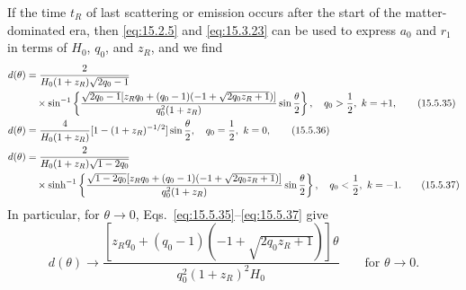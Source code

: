 If the time \(t_R\) of last scattering or emission occurs after the start of
the matter-dominated era, then \eqref{eq:15.2.5} and \eqref{eq:15.3.23} can
be used to express \(a_0\) and \(r_1\) in terms of \(H_0\), \(q_0\), and
\(z_R\), and we find
\begin{align}
  d(\theta)
  &=
  \frac{2}{H_0(1+z_R)\sqrt{2q_0-1}}
  \notag\\
  &\quad\times
  \sin^{-1}\left\{
    \frac{
      \sqrt{2q_0-1}
      [z_Rq_0+(q_0-1)(-1+\sqrt{2q_0z_R+1})]
    }{q_0^2(1+z_R)}
    \sin\frac{\theta}{2}
  \right\},
  \quad q_0>\frac12,\ k=+1,
  \tag{15.5.35}\label{eq:15.5.35}\\
  d(\theta)
  &=
  \frac{4}{H_0(1+z_R)}
  [1-(1+z_R)^{-1/2}]
  \sin\frac{\theta}{2},
  \quad q_0=\frac12,\ k=0,
  \tag{15.5.36}\label{eq:15.5.36}\\
  d(\theta)
  &=
  \frac{2}{H_0(1+z_R)\sqrt{1-2q_0}}
  \notag\\
  &\quad\times
  \sinh^{-1}\left\{
    \frac{
      \sqrt{1-2q_0}
      [z_Rq_0+(q_0-1)(-1+\sqrt{2q_0z_R+1})]
    }{q_0^2(1+z_R)}
    \sin\frac{\theta}{2}
  \right\},
  \quad q_0<\frac12,\ k=-1.
  \tag{15.5.37}\label{eq:15.5.37}
\end{align}
In particular, for \(\theta\to0\),
Eqs.~\eqref{eq:15.5.35}--\eqref{eq:15.5.37} give
\[
  d(\theta)
  \longrightarrow
  \frac{
    [z_Rq_0+(q_0-1)(-1+\sqrt{2q_0z_R+1})]\theta
  }{
    q_0^2(1+z_R)^2H_0
  }
  \qquad\text{for }\theta\to0.
\]

